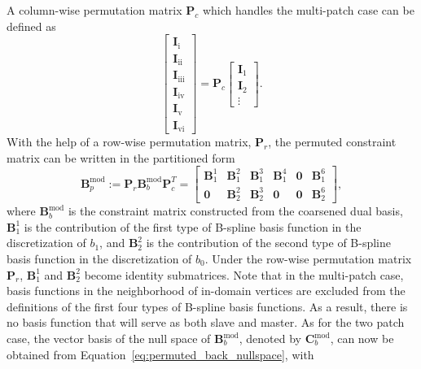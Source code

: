 A column-wise permutation matrix $\mathbf{P}_c$ which handles the multi-patch case can be defined as
\begin{equation}
  \begin{bmatrix}
    \mathbf{I}_\text{i}   \\
    \mathbf{I}_\text{ii}  \\
    \mathbf{I}_\text{iii} \\
    \mathbf{I}_\text{iv}  \\
    \mathbf{I}_\text{v}   \\
    \mathbf{I}_\text{vi}
  \end{bmatrix}=
  \mathbf{P}_c
  \begin{bmatrix}
    \mathbf{I}_1 \\
    \mathbf{I}_2 \\
    \vdots
  \end{bmatrix}.
\end{equation}
With the help of a row-wise permutation matrix, $\mathbf{P}_r$, the permuted constraint matrix can be written in the partitioned form
\begin{equation}
  \mathbf{B}^\text{mod}_p:=\mathbf{P}_r\mathbf{B}^\text{mod}_b\mathbf{P}_c^T=
  \begin{bmatrix}
    {\mathbf{B}}_1^1 & {\mathbf{B}}_1^2 & {\mathbf{B}}_1^3 & {\mathbf{B}}_1^4 & \mathbf{0} & {\mathbf{B}}_1^6 \\
    \mathbf{0}       & {\mathbf{B}}_2^2 & {\mathbf{B}}_2^3 & \mathbf{0}       & \mathbf{0} & {\mathbf{B}}_2^6
  \end{bmatrix},\label{eq:cross_point_constraint_structure}
\end{equation}
where $\mathbf{B}^\text{mod}_b$ is the constraint matrix constructed from the coarsened dual basis, $\mathbf{B}_1^1$ is the contribution of the first type of B-spline basis function in the discretization of $b_1$, and $\mathbf{B}_2^2$ is the contribution of the second type of B-spline basis function in the discretization of $b_0$. Under the row-wise permutation matrix $\mathbf{P}_r$, $\mathbf{B}_1^1$ and $\mathbf{B}_2^2$ become identity submatrices. Note that in the multi-patch case, basis functions in the neighborhood of in-domain vertices are excluded from the definitions of the first four types of B-spline basis functions. As a result, there is no basis function that will serve as both slave and master. As for the two patch case, the vector basis of the null space of $\mathbf{B}^\text{mod}_b$, denoted by $\mathbf{C}^\text{mod}_b$, can now be obtained from Equation~\eqref{eq:permuted_back_nullspace}, with
